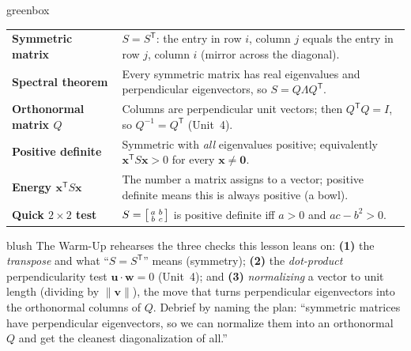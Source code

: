 \documentclass[10pt]{article}
\newcommand{\xx}{\mathbf{x}}
\newcommand{\zero}{\mathbf{0}}
\newcommand{\T}{\mathsf{T}}
\begin{document}
\begin{skillbox}{greenbox}
\renewcommand{\arraystretch}{1.3}
\begin{tabularx}{\linewidth}{@{}l X@{}}
\textbf{Symmetric matrix} & $S=S^{\T}$: the entry in row $i$, column $j$ equals the entry in row $j$, column $i$ (mirror across the diagonal). \\
\textbf{Spectral theorem} & Every symmetric matrix has real eigenvalues and perpendicular eigenvectors, so $S=Q\Lambda Q^{\T}$. \\
\textbf{Orthonormal matrix $Q$} & Columns are perpendicular unit vectors; then $Q^{\T}Q=I$, so $Q^{-1}=Q^{\T}$ (Unit~4). \\
\textbf{Positive definite} & Symmetric with \emph{all} eigenvalues positive; equivalently $\xx^{\T}S\xx>0$ for every $\xx\ne\zero$. \\
\textbf{Energy $\xx^{\T}S\xx$} & The number a matrix assigns to a vector; positive definite means this is always positive (a bowl). \\
\textbf{Quick $2\times2$ test} & $S=\begin{bsmallmatrix}a&b\\b&c\end{bsmallmatrix}$ is positive definite iff $a>0$ and $ac-b^2>0$. \\
\end{tabularx}
\end{skillbox}

\begin{fixedskillbox}{blush}
    The Warm-Up rehearses the three checks this lesson leans on: \textbf{(1)} the \emph{transpose} and what
    ``$S=S^{\T}$'' means (symmetry); \textbf{(2)} the \emph{dot-product} perpendicularity test
    $\mathbf{u}\cdot\mathbf{w}=0$ (Unit~4); and \textbf{(3)} \emph{normalizing} a vector to unit length
    (dividing by $\|\mathbf{v}\|$), the move that turns perpendicular eigenvectors into the orthonormal
    columns of $Q$. Debrief by naming the plan: ``symmetric matrices have perpendicular eigenvectors, so we
    can normalize them into an orthonormal $Q$ and get the cleanest diagonalization of all.''
\end{fixedskillbox}
\end{document}
